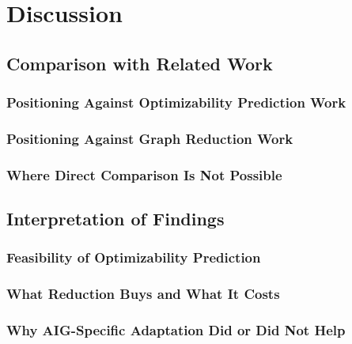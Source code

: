 \chapter{Discussion}
\label{sec:discussion}

\section{Comparison with Related Work}
\label{sec:discussion:relatedwork}

\subsection{Positioning Against Optimizability Prediction Work}
\label{sec:discussion:relatedwork:prediction}

\subsection{Positioning Against Graph Reduction Work}
\label{sec:discussion:relatedwork:reduction}

\subsection{Where Direct Comparison Is Not Possible}
\label{sec:discussion:relatedwork:incomparable}

\section{Interpretation of Findings}
\label{sec:discussion:interpretation}

\subsection{Feasibility of Optimizability Prediction}
\label{sec:discussion:interpretation:feasibility}

\subsection{What Reduction Buys and What It Costs}
\label{sec:discussion:interpretation:tradeoff}

\subsection{Why AIG-Specific Adaptation Did or Did Not Help}
\label{sec:discussion:interpretation:domain}

